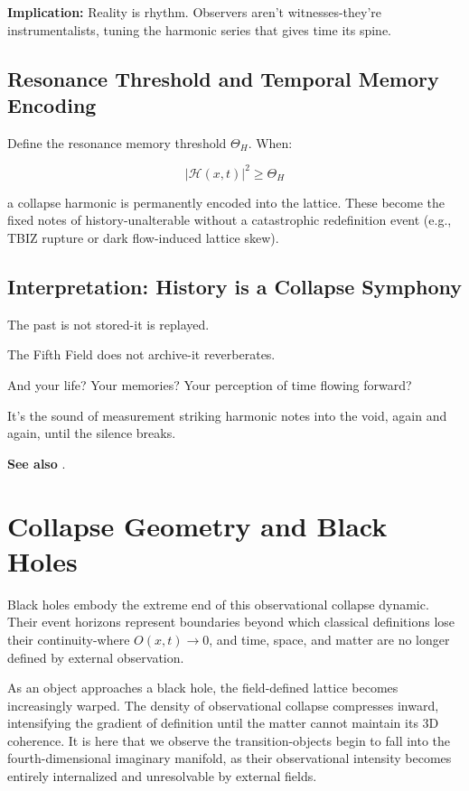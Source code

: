 \textbf{Implication:} Reality is rhythm. Observers aren’t witnesses-they’re instrumentalists, tuning the harmonic series that gives time its spine.

\subsection{Resonance Threshold and Temporal Memory Encoding}

Define the resonance memory threshold \( \Theta_H \). When:

\begin{equation}
\left| \mathcal{H}(x,t) \right|^2 \geq \Theta_H
\end{equation}

a collapse harmonic is permanently encoded into the lattice. These become the fixed notes of history-unalterable without a catastrophic redefinition event (e.g., TBIZ rupture or dark flow-induced lattice skew).

\subsection{Interpretation: History is a Collapse Symphony}

The past is not stored-it is replayed.

The Fifth Field does not archive-it reverberates.

And your life? Your memories? Your perception of time flowing forward?

It’s the sound of measurement striking harmonic notes into the void, again and again, until the silence breaks.

\textbf{See also} \cite{chapter8_meta}.



\section{Collapse Geometry and Black Holes} \cite{chapter8_meta}

Black holes embody the extreme end of this observational collapse dynamic. Their event horizons represent boundaries beyond which classical definitions lose their continuity-where $O(x,t) \rightarrow 0$, and time, space, and matter are no longer defined by external observation.

As an object approaches a black hole, the field-defined lattice becomes increasingly warped. The density of observational collapse compresses inward, intensifying the gradient of definition until the matter cannot maintain its 3D coherence. It is here that we observe the transition-objects begin to fall into the fourth-dimensional imaginary manifold, as their observational intensity becomes entirely internalized and unresolvable by external fields.

